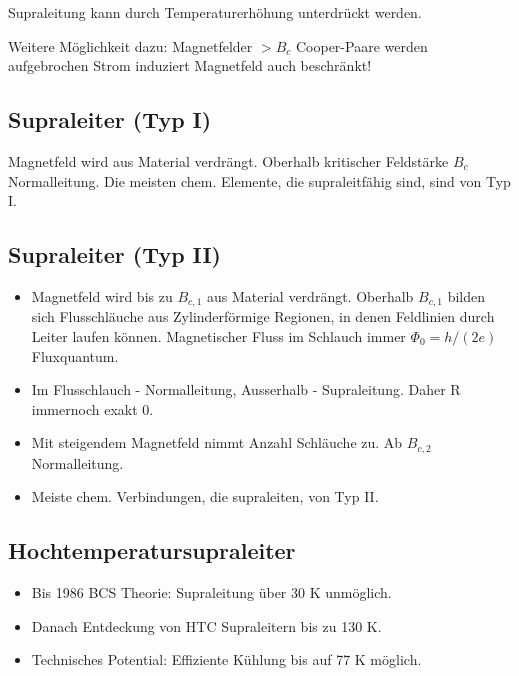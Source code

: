 \documentclass[10pt,a4paper]{scrartcl}
\begin{document}
\begin{multicols*}{3}
	
	
	\dahe Supraleitung kann durch Temperaturerhöhung unterdrückt werden.
	
	Weitere Möglichkeit dazu: Magnetfelder $>B_c$ \dahe Cooper-Paare werden aufgebrochen \dahe Strom induziert Magnetfeld \dahe auch beschränkt!
	
	\subsection*{Supraleiter (Typ I)}
	
	Magnetfeld wird aus Material verdrängt. Oberhalb kritischer Feldstärke $B_c$ \dahe Normalleitung. Die meisten chem. Elemente, die supraleitfähig sind, sind von Typ I.
	
	
	\subsection*{Supraleiter (Typ II)}
	
	\begin{itemize}
	\compaq
	\item
	Magnetfeld wird bis zu $B_{c,1}$ aus Material verdrängt. Oberhalb $B_{c,1}$ bilden sich Flusschläuche aus \dahe Zylinderförmige Regionen, in denen Feldlinien durch Leiter laufen können. Magnetischer Fluss im Schlauch immer $\Phi_0=h/(2e)$ \dahe Fluxquantum.
	\item
	Im Flusschlauch - Normalleitung, Ausserhalb - Supraleitung. Daher R immernoch exakt 0.
	\item
	Mit steigendem Magnetfeld nimmt Anzahl Schläuche zu. Ab $B_{c,2}$ Normalleitung.
	\item
	Meiste chem. Verbindungen, die supraleiten, von Typ II.
	\end{itemize}
	
	\subsection{Hochtemperatursupraleiter}

	\begin{itemize}
	\compaq
	\item
	Bis 1986 \dahe BCS Theorie: Supraleitung über 30 K unmöglich.
	\item
	Danach Entdeckung von HTC Supraleitern bis zu 130 K.
	\item
	Technisches Potential: Effiziente Kühlung bis auf 77 K möglich.
	\end{itemize}

\end{multicols*}
\end{document}
